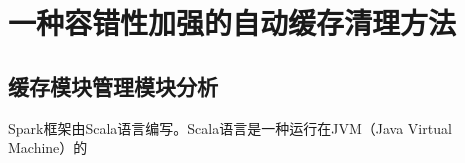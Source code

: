 \chapter{一种容错性加强的自动缓存清理方法}\label{chap:clean}

\section{缓存模块管理模块分析}

Spark框架由Scala语言编写。Scala语言是一种运行在JVM（Java Virtual Machine）的

